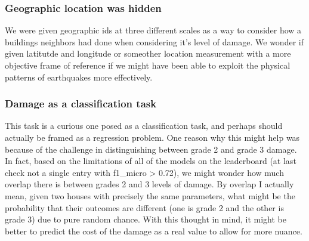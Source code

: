 \documentclass[11pt]{article}
\begin{document}
\subsubsection{Geographic location was
hidden}\label{geographic-location-was-hidden}

We were given geographic ids at three different scales as a way to
consider how a buildings neighbors had done when considering it's level
of damage. We wonder if given latitutde and longitude or someother
location measurement with a more objective frame of reference if we
might have been able to exploit the physical patterns of earthquakes
more effectively.

\subsubsection{Damage as a classification
task}\label{damage-as-a-classification-task}

This task is a curious one posed as a classification task, and perhaps
should actually be framed as a regression problem. One reason why this
might help was because of the challenge in distinguishing between grade
2 and grade 3 damage. In fact, based on the limitations of all of the
models on the leaderboard (at last check not a single entry with
f1\_micro \textgreater{} 0.72), we might wonder how much overlap there
is between grades 2 and 3 levels of damage. By overlap I actually mean,
given two houses with precisely the same parameters, what might be the
probability that their outcomes are different (one is grade 2 and the
other is grade 3) due to pure random chance. With this thought in mind,
it might be better to predict the cost of the damage as a real value to
allow for more nuance.


    
    
    
    
\end{document}
